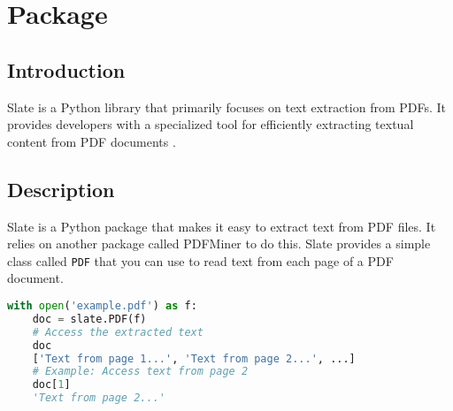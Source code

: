 %
%
%
%

\chapter{Package } %

\section{Introduction}

Slate is a Python library that primarily focuses on text extraction from PDFs. It provides developers with a specialized tool for efficiently extracting textual content from PDF documents \cite{slate:2015}.

\section{Description}
Slate is a Python package that makes it easy to extract text from PDF files. It relies on another package called PDFMiner to do this. Slate provides a simple class called \texttt{PDF} that you can use to read text from each page of a PDF document.

\begin{lstlisting}[language=Python, caption=Basic Text Extraction Using Slate]
	with open('example.pdf') as f:
	doc = slate.PDF(f)
	# Access the extracted text
	doc
	['Text from page 1...', 'Text from page 2...', ...]
	# Example: Access text from page 2
	doc[1]
	'Text from page 2...'
\end{lstlisting}

